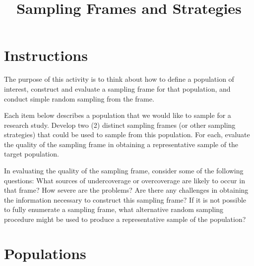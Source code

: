 \documentclass[a4, 12pt]{article}
\title{Sampling Frames and Strategies}
\author{}
\date{}
\begin{document}
\maketitle

\onehalfspacing

\section*{Instructions}

The purpose of this activity is to think about how to define a population of interest, construct and evaluate a sampling frame for that population, and conduct simple random sampling from the frame.

Each item below describes a population that we would like to sample for a research study. Develop two (2) distinct sampling frames (or other sampling strategies) that could be used to sample from this population. For each, evaluate the quality of the sampling frame in obtaining a representative sample of the target population.

In evaluating the quality of the sampling frame, consider some of the following questions: What sources of undercoverage or overcoverage are likely to occur in that frame? How severe are the problems? Are there any challenges in obtaining the information necessary to construct this sampling frame? If it is not possible to fully enumerate a sampling frame, what alternative random sampling procedure might be used to produce a representative sample of the population?


\singlespacing

\section*{Populations}
\end{document}
